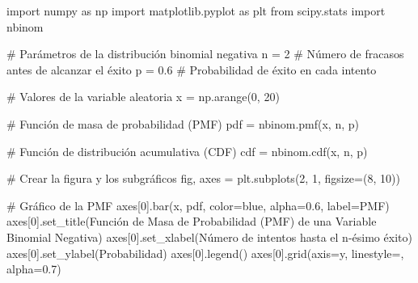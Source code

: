 \documentclass[
  letterpaper,
  DIV=11,
  numbers=noendperiod]{scrreprt}
\newenvironment{Shaded}{\begin{snugshade}}{\end{snugshade}}
\newcommand{\CommentTok}[1]{\textcolor[rgb]{0.37,0.37,0.37}{#1}}
\newcommand{\DecValTok}[1]{\textcolor[rgb]{0.68,0.00,0.00}{#1}}
\newcommand{\FloatTok}[1]{\textcolor[rgb]{0.68,0.00,0.00}{#1}}
\newcommand{\ImportTok}[1]{\textcolor[rgb]{0.00,0.46,0.62}{#1}}
\newcommand{\NormalTok}[1]{\textcolor[rgb]{0.00,0.23,0.31}{#1}}
\newcommand{\OperatorTok}[1]{\textcolor[rgb]{0.37,0.37,0.37}{#1}}
\newcommand{\StringTok}[1]{\textcolor[rgb]{0.13,0.47,0.30}{#1}}
\begin{document}
\begin{Shaded}
\begin{Highlighting}[]
\ImportTok{import}\NormalTok{ numpy }\ImportTok{as}\NormalTok{ np}
\ImportTok{import}\NormalTok{ matplotlib.pyplot }\ImportTok{as}\NormalTok{ plt}
\ImportTok{from}\NormalTok{ scipy.stats }\ImportTok{import}\NormalTok{ nbinom}

\CommentTok{\# Parámetros de la distribución binomial negativa}
\NormalTok{n }\OperatorTok{=} \DecValTok{2}  \CommentTok{\# Número de fracasos antes de alcanzar el éxito}
\NormalTok{p }\OperatorTok{=} \FloatTok{0.6}  \CommentTok{\# Probabilidad de éxito en cada intento}

\CommentTok{\# Valores de la variable aleatoria}
\NormalTok{x }\OperatorTok{=}\NormalTok{ np.arange(}\DecValTok{0}\NormalTok{, }\DecValTok{20}\NormalTok{)}

\CommentTok{\# Función de masa de probabilidad (PMF)}
\NormalTok{pdf }\OperatorTok{=}\NormalTok{ nbinom.pmf(x, n, p)}

\CommentTok{\# Función de distribución acumulativa (CDF)}
\NormalTok{cdf }\OperatorTok{=}\NormalTok{ nbinom.cdf(x, n, p)}

\CommentTok{\# Crear la figura y los subgráficos}
\NormalTok{fig, axes }\OperatorTok{=}\NormalTok{ plt.subplots(}\DecValTok{2}\NormalTok{, }\DecValTok{1}\NormalTok{, figsize}\OperatorTok{=}\NormalTok{(}\DecValTok{8}\NormalTok{, }\DecValTok{10}\NormalTok{))}

\CommentTok{\# Gráfico de la PMF}
\NormalTok{axes[}\DecValTok{0}\NormalTok{].bar(x, pdf, color}\OperatorTok{=}\StringTok{\textquotesingle{}blue\textquotesingle{}}\NormalTok{, alpha}\OperatorTok{=}\FloatTok{0.6}\NormalTok{, label}\OperatorTok{=}\StringTok{\textquotesingle{}PMF\textquotesingle{}}\NormalTok{)}
\NormalTok{axes[}\DecValTok{0}\NormalTok{].set\_title(}\StringTok{\textquotesingle{}Función de Masa de Probabilidad (PMF) de una Variable Binomial Negativa\textquotesingle{}}\NormalTok{)}
\NormalTok{axes[}\DecValTok{0}\NormalTok{].set\_xlabel(}\StringTok{\textquotesingle{}Número de intentos hasta el n{-}ésimo éxito\textquotesingle{}}\NormalTok{)}
\NormalTok{axes[}\DecValTok{0}\NormalTok{].set\_ylabel(}\StringTok{\textquotesingle{}Probabilidad\textquotesingle{}}\NormalTok{)}
\NormalTok{axes[}\DecValTok{0}\NormalTok{].legend()}
\NormalTok{axes[}\DecValTok{0}\NormalTok{].grid(axis}\OperatorTok{=}\StringTok{\textquotesingle{}y\textquotesingle{}}\NormalTok{, linestyle}\OperatorTok{=}\StringTok{\textquotesingle{}{-}{-}\textquotesingle{}}\NormalTok{, alpha}\OperatorTok{=}\FloatTok{0.7}\NormalTok{)}


\end{Highlighting}
\end{Shaded}
\end{document}
